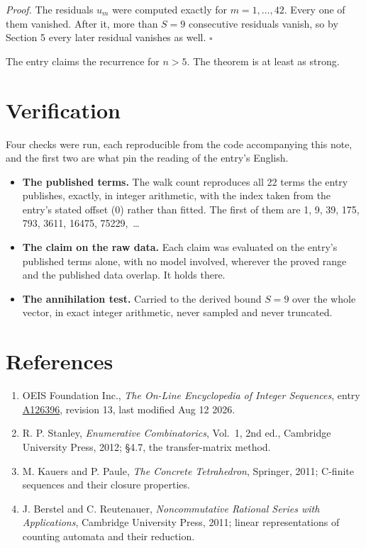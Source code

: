 \documentclass[11pt]{article}
\theoremstyle{definition}
\begin{document}
{\itshape Proof.} The residuals $u_m$ were computed exactly for $m = 1,\dots,42$. Every one of them vanished. After it, more than $S = 9$ consecutive residuals vanish, so by Section 5 every later residual vanishes as well. $\square$

The entry claims the recurrence for $n > 5$. The theorem is at least as strong.

\section{Verification}

Four checks were run, each reproducible from the code accompanying this note, and the first two are what pin the reading of the entry's English.

\begin{itemize}

\item {\bfseries The published terms.} The walk count reproduces all 22 terms the entry publishes, exactly, in integer arithmetic, with the index taken from the entry's stated offset (0) rather than fitted. The first of them are 1, 9, 39, 175, 793, 3611, 16475, 75229,~\dots

\item {\bfseries The claim on the raw data.} Each claim was evaluated on the entry's published terms alone, with no model involved, wherever the proved range and the published data overlap. It holds there.

\item {\bfseries The annihilation test.} Carried to the derived bound $S = 9$ over the whole vector, in exact integer arithmetic, never sampled and never truncated.

\end{itemize}

\section{References}

\begin{enumerate}

\item OEIS Foundation Inc., \emph{The On-Line Encyclopedia of Integer Sequences}, entry \href{https://oeis.org/A126396}{A126396}, revision 13, last modified Aug 12 2026.

\item R. P. Stanley, \emph{Enumerative Combinatorics}, Vol.~1, 2nd ed., Cambridge University Press, 2012; \S4.7, the transfer-matrix method.

\item M. Kauers and P. Paule, \emph{The Concrete Tetrahedron}, Springer, 2011; C-finite sequences and their closure properties.

\item J. Berstel and C. Reutenauer, \emph{Noncommutative Rational Series with Applications}, Cambridge University Press, 2011; linear representations of counting automata and their reduction.

\end{enumerate}
\end{document}
